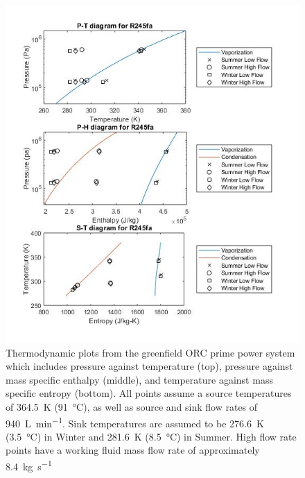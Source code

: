 \begin{figure}[p]
	\centering

	\includegraphics[width=\textwidth]{figures/GreenfieldThermoPlots}
	\caption{Thermodynamic plots from the greenfield ORC prime power system which includes pressure against temperature (top), pressure against mass specific enthalpy (middle), and temperature against mass specific entropy (bottom). All points assume a source temperatures of \SI{364.5}{\kelvin} (\SI{91}{\degreeCelsius}), as well as source and sink flow rates of \SI{940}{\liter\per\minute}. Sink temperatures are assumed to be \SI{276.6}{\kelvin} (\SI{3.5}{\degreeCelsius}) in Winter and \SI{281.6}{\kelvin} (\SI{8.5}{\degreeCelsius}) in Summer. High flow rate points have a working fluid mass flow rate of approximately \SI{8.4}{\kilogram\per\second}}
\label{fig:gf_themoplots}
\end{figure}